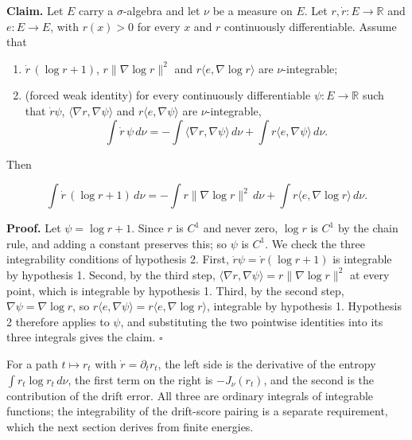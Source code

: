\documentclass[11pt,a4paper]{report}
\begin{document}
\textbf{Claim.} Let \(E\) carry a \(\sigma\)-algebra and let \(\nu\) be a measure on \(E\). Let \(r,\dot r:E\to\mathbb R\) and \(e:E\to E\), with \(r(x)>0\) for every \(x\) and \(r\) continuously differentiable. Assume that



\begin{enumerate}


\item \(\dot r\,(\log r+1)\), \(r\|\nabla\log r\|^2\) and \(r\langle e,\nabla\log r\rangle\) are \(\nu\)-integrable;

\item (forced weak identity) for every continuously differentiable \(\psi:E\to\mathbb R\) such that \(\dot r\psi\), \(\langle\nabla r,\nabla\psi\rangle\) and \(r\langle e,\nabla\psi\rangle\) are \(\nu\)-integrable,
\[\int\dot r\,\psi\,d\nu=-\int\langle\nabla r,\nabla\psi\rangle\,d\nu+\int r\langle e,\nabla\psi\rangle\,d\nu.\]

\end{enumerate}



Then


\[\int\dot r\,(\log r+1)\,d\nu=-\int r\|\nabla\log r\|^2\,d\nu+\int r\langle e,\nabla\log r\rangle\,d\nu.\]


\textbf{Proof.} Let \(\psi=\log r+1\). Since \(r\) is \(C^1\) and never zero, \(\log r\) is \(C^1\) by the chain rule, and adding a constant preserves this; so \(\psi\) is \(C^1\). We check the three integrability conditions of hypothesis 2. First, \(\dot r\psi=\dot r(\log r+1)\) is integrable by hypothesis 1. Second, by the third step, \(\langle\nabla r,\nabla\psi\rangle=r\|\nabla\log r\|^2\) at every point, which is integrable by hypothesis 1. Third, by the second step, \(\nabla\psi=\nabla\log r\), so \(r\langle e,\nabla\psi\rangle=r\langle e,\nabla\log r\rangle\), integrable by hypothesis 1. Hypothesis 2 therefore applies to \(\psi\), and substituting the two pointwise identities into its three integrals gives the claim. \(\square\)




For a path \(t\mapsto r_t\) with \(\dot r=\partial_tr_t\), the left side is the derivative of the entropy \(\int r_t\log r_t\,d\nu\), the first term on the right is \(-J_\nu(r_t)\), and the second is the contribution of the drift error. All three are ordinary integrals of integrable functions; the integrability of the drift-score pairing is a separate requirement, which the next section derives from finite energies.
\end{document}

